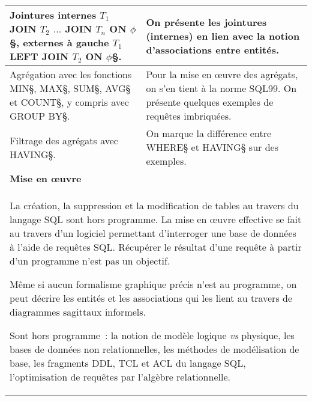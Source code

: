 \begin{longtable}{|p{\lnotion}|p{\comment}|}
    Jointures internes \§$T_1$ JOIN $T_2$ $\dots$ JOIN $T_n$ ON $\phi$§, externes à gauche \§$T_1$ LEFT JOIN $T_2$ ON $\phi$§. &
      On présente les jointures (internes) en lien avec la notion d'associations
    entre entités.
 \\ \hline

    Agrégation avec les fonctions \§MIN§, \§MAX§, \§SUM§,
        \§AVG§ et \§COUNT§, y compris avec \§GROUP BY§. & Pour la mise en \oe uvre des agrégats, on s'en tient à la norme SQL99.
            On présente quelques exemples de requêtes imbriquées.
\\
\hline
    Filtrage des agrégats avec \§HAVING§. & On marque la différence entre \§WHERE§ et \§HAVING§ sur des exemples.
\\

    \hline \hline
    \multicolumn{2}{|p{\lmoe}|}{\textbf{Mise en \oe uvre}} \\
    \hline
    \multicolumn{2}{|p{\lmoe}|}{
        La création, la suppression et la modification de tables au travers du langage
        SQL sont hors programme. La mise en \oe uvre effective se fait au
        travers d'un logiciel permettant d'interroger une base de données à
        l'aide de requêtes SQL. Récupérer le résultat d'une requête à partir
        d'un programme n'est pas un objectif.

        Même si aucun formalisme graphique précis n'est au programme,
        on peut décrire
        les entités et les associations qui les lient au travers de
        diagrammes sagittaux informels.

        Sont hors programme~: la notion de modèle logique \textit{vs} physique, les bases de données non relationnelles, les méthodes de modélisation de base,
        les fragments DDL, TCL et ACL du langage SQL, l'optimisation de requêtes par l'algèbre relationnelle.
        } \\
        \hline

\end{longtable}
